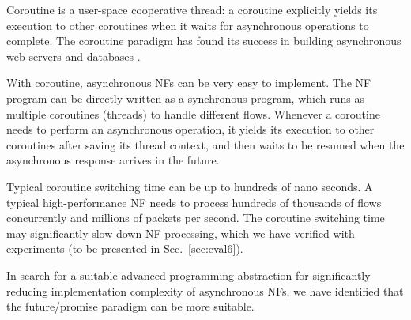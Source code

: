 Coroutine is a user-space cooperative thread: a coroutine explicitly yields its execution to other coroutines when it waits for asynchronous operations to complete. The coroutine paradigm has found its success in building asynchronous web servers \cite{tornado-web-server} and databases \cite{rethinkdb}. %

With coroutine, asynchronous NFs can be very easy to implement. The NF program can be directly written as a synchronous program, which runs as multiple coroutines (threads) to handle different flows. Whenever a coroutine needs to perform an asynchronous operation, it yields its execution to other coroutines after saving its thread context, and then waits to be resumed when the asynchronous response arrives in the future.

Typical coroutine switching time can be up to hundreds of nano seconds. A typical high-performance NF needs to process hundreds of thousands of flows concurrently and millions of packets per second. The coroutine switching time may significantly slow down NF processing, which we have verified with experiments (to be presented in Sec.~\ref{sec:eval6}). %

In search for a suitable advanced programming abstraction for significantly reducing implementation complexity of asynchronous NFs, we have identified that the future/promise paradigm can be more suitable. %





